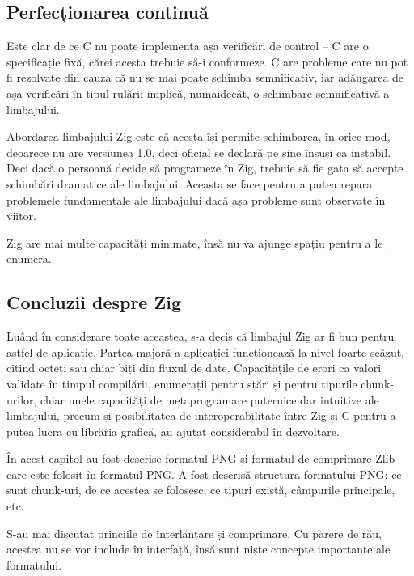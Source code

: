 \documentclass[a4paper,12pt]{report}
\begin{document}
\subsection{Perfecționarea continuă}

Este clar de ce C nu poate implementa așa verificări de control --
C are o specificație fixă, cărei acesta trebuie să-i conformeze.
C are probleme care nu pot fi rezolvate din cauza că nu se mai poate schimba semnificativ,
iar adăugarea de așa verificări în tipul rulării implică, numaidecât,
o schimbare semnificativă a limbajului.

Abordarea limbajului Zig este că acesta își permite schimbarea,
în orice mod, deoarece nu are versiunea 1.0, deci oficial se declară pe sine însuși ca instabil.
Deci dacă o persoană decide să programeze în Zig,
trebuie să fie gata să accepte schimbări dramatice ale limbajului.
Aceasta se face pentru a putea repara problemele fundamentale
ale limbajului dacă așa probleme sunt observate în viitor.

Zig are mai multe capacități minunate, însă nu va ajunge spațiu pentru a le enumera.

\subsection{Concluzii despre Zig}

Luând în considerare toate aceastea, s-a decis că limbajul Zig ar fi bun pentru astfel de aplicație.
Partea majoră a aplicației funcționează la nivel foarte scăzut,
citind octeți sau chiar biți din fluxul de date.
Capacitățile de erori ca valori validate în timpul compilării,
enumerații pentru stări și pentru tipurile chunk-urilor,
chiar unele capacități de metaprogramare puternice dar intuitive ale limbajului,
precum și posibilitatea de interoperabilitate între Zig și C pentru a putea lucra cu librăria grafică,
au ajutat considerabil în dezvoltare.


În acest capitol au fost descrise formatul \ac{PNG} și
formatul de comprimare Zlib care este folosit în formatul \ac{PNG}.
A fost descrisă structura formatului \ac{PNG}: ce sunt chunk-uri,
de ce acestea se folosesc, ce tipuri există, câmpurile principale, etc.

S-au mai discutat princiile de înterlănțare și comprimare.
Cu părere de rău, acestea nu se vor include în interfață, însă sunt niște concepte importante ale formatului.
\end{document}
